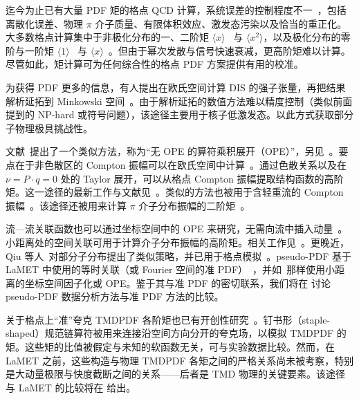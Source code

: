 迄今为止已有大量 PDF 矩的格点 QCD 计算，系统误差的控制程度不一~\cite{Lin:2017snn}，包括离散化误差、物理 $\pi$ 介子质量、有限体积效应、激发态污染以及恰当的重正化。大多数格点计算集中于非极化分布的一、二阶矩 $\langle x\rangle$~\cite{Green:2012ud,Alexandrou:2017oeh,Bali:2014gha} 与 $\langle x^2\rangle$\cite{Dolgov:2002zm,Deka:2008xr}，以及极化分布的零阶与一阶矩 $\langle 1\rangle$~\cite{Gong:2015iir,Alexandrou:2017oeh,Chang:2018uxx,Alexandrou:2019brg} 与 $\langle x\rangle$~\cite{Aoki:2010xg,Abdel-Rehim:2015owa}。但由于幂次发散与信号快速衰减，更高阶矩难以计算。尽管如此，矩计算可为任何综合性的格点 PDF 方案提供有用的校准。

为获得 PDF 更多的信息，有人提出在欧氏空间计算 DIS 的强子张量，再把结果解析延拓到 Minkowski 空间~\cite{Liu:1993cv,Liu:1998um,
	Liu:1999ak,Liu:2016djw,Liu:2017lpe,Liu:2020okp}。由于解析延拓的数值方法难以精度控制（类似前面提到的 NP-hard 或符号问题），该途径主要用于核子低激发态。以此方式获取部分子物理极具挑战性。

文献~\cite{Aglietti:1998ur,Martinelli:1998hz}提出了一个类似方法，称为``无 OPE 的算符乘积展开（OPE）''，另见~\cite{Dawson:1997ic,Capitani:1998fe,Capitani:1999fm}。要点在于非色散区的 Compton 振幅可以在欧氏空间中计算~\cite{Ji:2001wha}。通过色散关系以及在 $\nu = P\cdot q=0$ 处的 Taylor 展开，可以从格点 Compton 振幅提取结构函数的高阶矩。这一途径的最新工作与文献见~\cite{Chambers:2017dov,Hannaford-Gunn:2020pvu,Horsley:2020ltc}。类似的方法也被用于含轻重流的 Compton 振幅~\cite{Detmold:2005gg}。该途径还被用来计算 $\pi$ 介子分布振幅的二阶矩~\cite{Detmold:2018kwu,Detmold:2020lev}。

流—流关联函数也可以通过坐标空间中的 OPE 来研究，无需向流中插入动量~\cite{Braun:2007wv}。小距离处的空间关联可用于计算介子分布振幅的高阶矩。相关工作见~\cite{Braun:2015axa,Bali:2018spj,Bali:2019dqc}。更晚近，Qiu 等人~\cite{Ma:2017pxb}对部分子分布提出了类似策略，并已用于格点模拟~\cite{Sufian:2019bol,Sufian:2020vzb}。pseudo-PDF 基于 LaMET 中使用的等时关联（或 Fourier 空间的准 PDF）~\cite{Radyushkin:2017cyf,Radyushkin:2019owq}，并如~\cite{Braun:2007wv}那样使用小距离的坐标空间因子化或 OPE。鉴于其与准 PDF 的密切联系，我们将在  讨论 pseudo-PDF 数据分析方法与准 PDF 方法的比较。

关于格点上``准''夸克 TMDPDF 各阶矩也已有开创性研究~\cite{Hagler:2009mb,Musch:2010ka,Musch:2011er,Engelhardt:2015xja,Yoon:2017qzo}。钉书形（staple-shaped）规范链算符被用来连接沿空间方向分开的夸克场，以模拟 TMDPDF 的矩。这些矩的比值被假定与未知的软函数无关，可与实验数据比较。然而，在 LaMET 之前，这些构造与物理 TMDPDF 各矩之间的严格关系尚未被考察，特别是大动量极限与快度截断之间的关系——后者是 TMD 物理的关键要素。该途径与 LaMET 的比较将在  给出。
